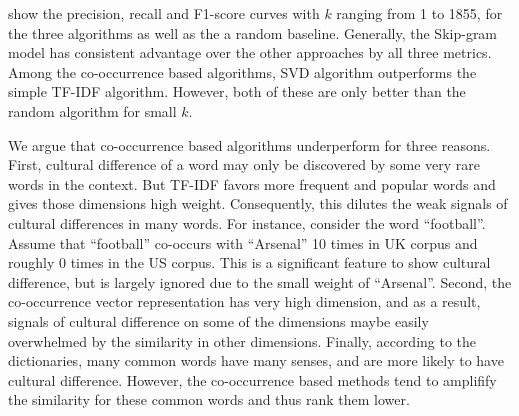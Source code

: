  show the precision, recall and F1-score curves
with $k$ ranging from 1 to 1855,
for the three algorithms as well as the a random baseline.
Generally, the Skip-gram model has consistent advantage over the other
approaches by all three metrics. Among the co-occurrence based algorithms,
SVD algorithm outperforms the simple TF-IDF algorithm. However, both of these
are only better than the random algorithm for small $k$.

We argue that co-occurrence based algorithms underperform for three reasons.
First, cultural difference of a word may only be discovered by some very rare
words in the context. But TF-IDF favors more frequent and popular words and
gives those dimensions high weight. Consequently, this dilutes the weak
signals of cultural differences in many words.
For instance, consider the word
``football''. Assume that ``football'' co-occurs with ``Arsenal'' 10 times
in UK corpus and roughly 0 times in the US corpus. This is a significant
feature to show cultural difference, but is largely ignored due to the
small weight of ``Arsenal''.  Second, the co-occurrence
vector representation has very high dimension, and as a result, signals of
cultural difference on some of the dimensions maybe easily overwhelmed by
the similarity in other dimensions. Finally, according to the dictionaries,
many common words have many senses, and are more likely to have
cultural difference. However, the co-occurrence based methods tend to amplifify
the similarity for these common words and thus rank them lower.

%
%

